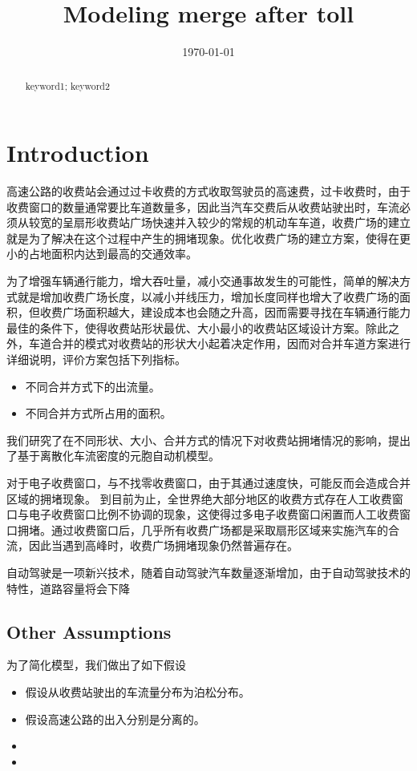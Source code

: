 \documentclass{mcmthesis}
\title{Modeling merge after toll}
\date{\today}
\begin{document}
\begin{abstract}
\lipsum[1]
\begin{keywords}
keyword1; keyword2
\end{keywords}
\end{abstract}
\maketitle
\tableofcontents
\newpage
\section{Introduction}
高速公路的收费站会通过过卡收费的方式收取驾驶员的高速费，过卡收费时，由于收费窗口的数量通常要比车道数量多，因此当汽车交费后从收费站驶出时，车流必须从较宽的呈扇形收费站广场快速并入较少的常规的机动车车道，收费广场的建立就是为了解决在这个过程中产生的拥堵现象。优化收费广场的建立方案，使得在更小的占地面积内达到最高的交通效率。


为了增强车辆通行能力，增大吞吐量，减小交通事故发生的可能性，简单的解决方式就是增加收费广场长度，以减小并线压力，增加长度同样也增大了收费广场的面积，但收费广场面积越大，建设成本也会随之升高，因而需要寻找在车辆通行能力最佳的条件下，使得收费站形状最优、大小最小的收费站区域设计方案。除此之外，车道合并的模式对收费站的形状大小起着决定作用，因而对合并车道方案进行详细说明，评价方案包括下列指标。

\begin{itemize}
	\item 不同合并方式下的出流量。
	\item  不同合并方式所占用的面积。
\end{itemize}

我们研究了在不同形状、大小、合并方式的情况下对收费站拥堵情况的影响，提出了基于离散化车流密度的元胞自动机模型。

对于电子收费窗口，与不找零收费窗口，由于其通过速度快，可能反而会造成合并区域的拥堵现象\cite{spiliopoulou2009toll}。
到目前为止，全世界绝大部分地区的收费方式存在人工收费窗口与电子收费窗口比例不协调的现象，这使得过多电子收费窗口闲置而人工收费窗口拥堵。通过收费窗口后，几乎所有收费广场都是采取扇形区域来实施汽车的合流，因此当遇到高峰时，收费广场拥堵现象仍然普遍存在。

自动驾驶是一项新兴技术，随着自动驾驶汽车数量逐渐增加，由于自动驾驶技术的特性，道路容量将会下降



\subsection{Other Assumptions}
为了简化模型，我们做出了如下假设
\begin{itemize}
\item 假设从收费站驶出的车流量分布为泊松分布。
\item 假设高速公路的出入分别是分离的。
\item 
\item
\end{itemize}
\end{document}

